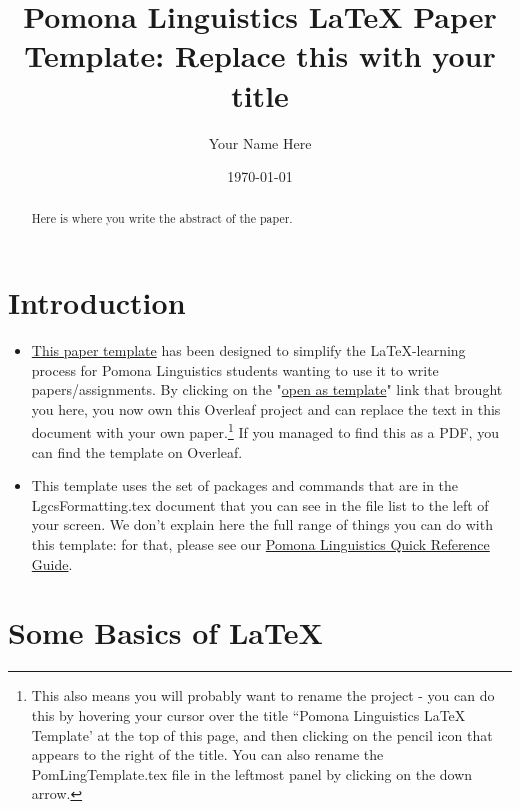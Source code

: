 \documentclass{article}
\title{Pomona Linguistics \LaTeX{} Paper Template: Replace this with your title}
\author{Your Name Here}
\date{\today}
\begin{document}
\maketitle

\begin{abstract}

Here is where you write the abstract of the paper.

\end{abstract}

\section{Introduction}

\begin{itemize}

\item \href{https://www.overleaf.com/latex/templates/pomona-linguistics-latex-template/bvdxdtpwysnd}{This paper template} has been designed to simplify the \LaTeX{}-learning process for Pomona Linguistics students wanting to use it to write papers/assignments. By clicking on the "\href{https://www.overleaf.com/latex/templates/pomona-linguistics-latex-template/bvdxdtpwysnd}{open as template}" link that brought you here, you now own this Overleaf project and can replace the text in this document with your own paper.\footnote{This also means you will probably want to rename the project - you can do this by hovering your cursor over the title ``Pomona Linguistics LaTeX Template' at the top of this page, and then clicking on the pencil icon that appears to the right of the title. You can also rename the PomLingTemplate.tex file in the leftmost panel by clicking on the down arrow.} If you managed to find this as a PDF, you can find the template on Overleaf. 

\item This template uses the set of packages and commands that are in the LgcsFormatting.tex document that you can see in the file list to the left of your screen. We don't explain here the full range of things you can do with this template: for that, please see our \href{https://www.overleaf.com/latex/templates/pomona-linguistics-quick-reference-guide/jthrqbrktmrd}{Pomona Linguistics Quick Reference Guide}.

\end{itemize}

\section{Some Basics of \LaTeX{}}
\end{document}
